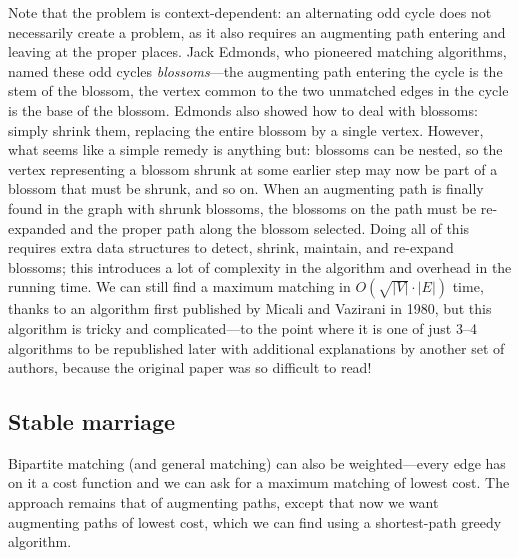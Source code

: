 \documentclass[11pt]{article}
\begin{document}
Note that the problem is context-dependent: an alternating odd cycle
does not necessarily create a problem, as it also requires an augmenting
path entering and leaving at the proper places.  Jack Edmonds, who
pioneered matching algorithms, named these odd cycles \emph{blossoms}---the
augmenting path entering the cycle is the stem of the blossom, the vertex
common to the two unmatched edges in the cycle is the base of the blossom.
Edmonds also showed how to deal with blossoms: simply shrink them, replacing
the entire blossom by a single vertex.  However, what seems like a simple
remedy is anything but: blossoms can be nested, so the vertex representing
a blossom shrunk at some earlier step may now be part of a blossom that must
be shrunk, and so on.  When an augmenting path is finally found in the
graph with shrunk blossoms, the blossoms on the path must be re-expanded
and the proper path along the blossom selected.  Doing all of this requires
extra data structures to detect, shrink, maintain, and re-expand blossoms;
this introduces a lot of complexity in the algorithm and overhead in the
running time.  We can still find a maximum matching in $O(\sqrt{|V|}\cdot|E|)$
time, thanks to an algorithm first published by Micali and Vazirani in 1980,
but this algorithm is tricky and complicated---to the point where it is one
of just 3--4 algorithms to be republished later with additional explanations
by another set of authors, because the original paper was so difficult to read!

\subsection{Stable marriage}
Bipartite matching (and general matching) can also be weighted---every edge
has on it a cost function and we can ask for a maximum matching of lowest
cost.   The approach remains that of augmenting paths, except that now we
want augmenting paths of lowest cost, which we can find using a shortest-path
greedy algorithm.
\end{document}
